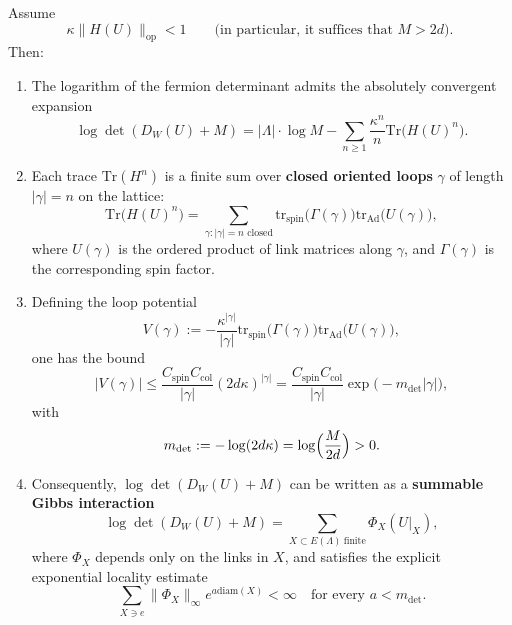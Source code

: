 \begin{theorem}
\label{thm:quasi-locality-corrected}
Assume
\[
\kappa \|H(U)\|_{\mathrm{op}} < 1\qquad\text{(in particular, it suffices that }M>2d\text{)}.
\]
Then:
\begin{enumerate}
\item The logarithm of the fermion determinant admits the absolutely convergent expansion
   \[
   \log\det(D_W(U)+M)
   =
   |\Lambda|\cdot\log M - \sum_{n\ge 1}\frac{\kappa^n}{n}\mathrm{Tr}\bigl(H(U)^n\bigr).
   \]

\item Each trace $\mathrm{Tr}(H^n)$ is a finite sum over \textbf{closed oriented loops} $\gamma$ of length $|\gamma|=n$ on the lattice:
   \[
   \mathrm{Tr}\bigl(H(U)^n\bigr)
   =
   \sum_{\gamma:|\gamma|=n \text{ closed}}
   \mathrm{tr}_{\mathrm{spin}}\bigl(\Gamma(\gamma)\bigr)
   \mathrm{tr}_{\mathrm{Ad}}\bigl(U(\gamma)\bigr),
   \]
   where $U(\gamma)$ is the ordered product of link matrices along $\gamma$, and $\Gamma(\gamma)$ is the corresponding spin factor.

\item Defining the loop potential
   \[
   V(\gamma) := -\frac{\kappa^{|\gamma|}}{|\gamma|}
   \mathrm{tr}_{\mathrm{spin}}\bigl(\Gamma(\gamma)\bigr)
   \mathrm{tr}_{\mathrm{Ad}}\bigl(U(\gamma)\bigr),
   \]
   one has the bound
   \[
   |V(\gamma)|
   \le
   \frac{C_{\mathrm{spin}}C_{\mathrm{col}}}{|\gamma|}(2d\kappa)^{|\gamma|}
   =
   \frac{C_{\mathrm{spin}}C_{\mathrm{col}}}{|\gamma|}
   \exp\bigl(-m_{\det}|\gamma|\bigr),
   \]
   with
   \[
   m_{\det}:=-\log(2d\kappa)=\log\Bigl(\frac{M}{2d}\Bigr)>0.
   \]

\item Consequently, $\log\det(D_W(U)+M)$ can be written as a \textbf{summable Gibbs interaction}
   \[
   \log\det(D_W(U)+M)=\sum_{X\subset E(\Lambda)\ \mathrm{finite}}\Phi_X(U|_X),
   \]
   where $\Phi_X$ depends only on the links in $X$, and satisfies the explicit exponential locality estimate
   \[
   \sum_{X\ni e}\|\Phi_X\|_\infty e^{a\mathrm{diam}(X)}
   < \infty
   \quad\text{for every }a<m_{\det}.
   \]
\end{enumerate}
\end{theorem}

